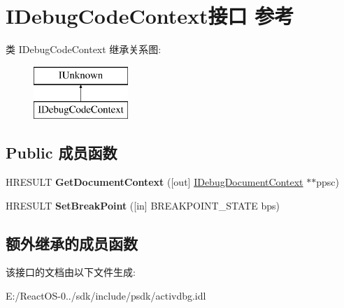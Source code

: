 \hypertarget{interface_i_debug_code_context}{}\section{I\+Debug\+Code\+Context接口 参考}
\label{interface_i_debug_code_context}
类 I\+Debug\+Code\+Context 继承关系图\+:\begin{figure}[H]
\begin{center}
\leavevmode
\includegraphics[height=2.000000cm]{interface_i_debug_code_context}
\end{center}
\end{figure}
\subsection*{Public 成员函数}
\begin{DoxyCompactItemize}
\item 
\mbox{\label{interface_i_debug_code_context_a92b8585a7ddef00b8cef96a5198d29d3}} 
H\+R\+E\+S\+U\+LT {\bfseries Get\+Document\+Context} (\mbox{[}out\mbox{]} \hyperlink{interface_i_debug_document_context}{I\+Debug\+Document\+Context} $\ast$$\ast$ppsc)
\item 
\mbox{\label{interface_i_debug_code_context_a89e970ddb000d9eb79b9af3da73f023d}} 
H\+R\+E\+S\+U\+LT {\bfseries Set\+Break\+Point} (\mbox{[}in\mbox{]} B\+R\+E\+A\+K\+P\+O\+I\+N\+T\+\_\+\+S\+T\+A\+TE bps)
\end{DoxyCompactItemize}
\subsection*{额外继承的成员函数}


该接口的文档由以下文件生成\+:\begin{DoxyCompactItemize}
\item 
E\+:/\+React\+O\+S-\/0../sdk/include/psdk/activdbg.\+idl\end{DoxyCompactItemize}
